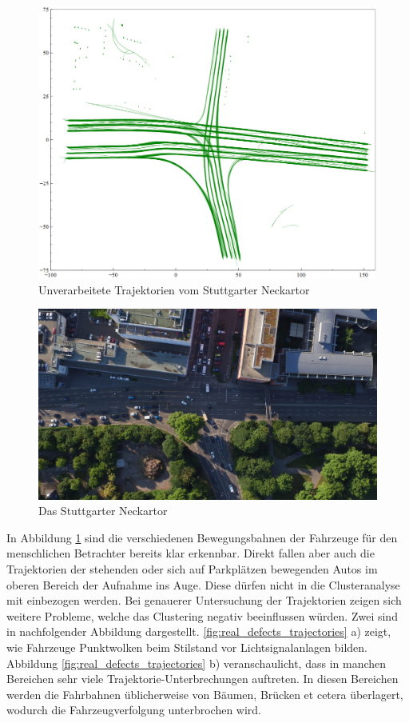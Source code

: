 \begin{figure}[H]
\centering
    \includegraphics[width=0.5\linewidth]{resources/img/umsetzung/U1/Plot_RawTrajectories_Neckartor}
\caption{Unverarbeitete Trajektorien vom Stuttgarter Neckartor}
\label{fig:real_trajs_raw_neckartor}
\end{figure}

\begin{figure}[H]
\centering
    \includegraphics[width=0.7\linewidth]{resources/img/umsetzung/U1/Neckartor_Aufnahme}
\caption{Das Stuttgarter Neckartor}
\label{fig:real_neckartor}
\end{figure}

In Abbildung \ref{fig:real_trajs_raw_neckartor} sind die verschiedenen Bewegungsbahnen der Fahrzeuge für
den menschlichen Betrachter bereits klar erkennbar.
Direkt fallen aber auch die Trajektorien der stehenden oder sich auf Parkplätzen
bewegenden Autos im oberen Bereich der Aufnahme ins Auge. Diese dürfen nicht in die Clusteranalyse mit einbezogen werden.
Bei genauerer Untersuchung der Trajektorien zeigen sich weitere Probleme, welche das Clustering negativ
beeinflussen würden. Zwei sind in nachfolgender Abbildung dargestellt.
\ref{fig:real_defects_trajectories} a) zeigt, wie Fahrzeuge Punktwolken beim Stilstand vor Lichtsignalanlagen bilden.
Abbildung \ref{fig:real_defects_trajectories} b) veranschaulicht, dass in manchen Bereichen sehr viele Trajektorie-Unterbrechungen
auftreten. In diesen Bereichen werden die Fahrbahnen üblicherweise von Bäumen, Brücken et cetera überlagert, wodurch
die Fahrzeugverfolgung unterbrochen wird.

